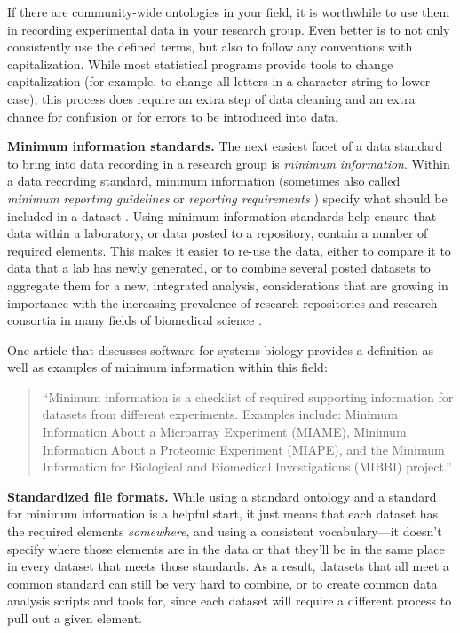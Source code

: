 \documentclass[]{tufte-book}
\begin{document}
If there are community-wide ontologies in your field, it is worthwhile to use
them in recording experimental data in your research group. Even better is to
not only consistently use the defined terms, but also to follow any conventions
with capitalization. While most statistical programs provide tools to change
capitalization (for example, to change all letters in a character string to
lower case), this process does require an extra step of data cleaning and an
extra chance for confusion or for errors to be introduced into data.

\textbf{Minimum information standards.} The next easiest facet of a data standard to
bring into data recording in a research group is \emph{minimum information}. Within a
data recording standard, minimum information (sometimes also called \emph{minimum
reporting guidelines} \citep{sansone2012toward} or \emph{reporting requirements}
\citep{brazma2006standards}) specify what should be included in a dataset
\citep{ghosh2011software}. Using minimum information standards help ensure that data
within a laboratory, or data posted to a repository, contain a number of
required elements. This makes it easier to re-use the data, either to compare it
to data that a lab has newly generated, or to combine several posted datasets to
aggregate them for a new, integrated analysis, considerations that are growing
in importance with the increasing prevalence of research repositories and
research consortia in many fields of biomedical science \citep{keller2017evolution}.

One article that discusses software for systems biology provides a definition
as well as examples of minimum information within this field:

\begin{quote}
``Minimum information is a checklist of required supporting information for
datasets from different experiments. Examples include: Minimum Information About
a Microarray Experiment (MIAME), Minimum Information About a Proteomic
Experiment (MIAPE), and the Minimum Information for Biological and Biomedical
Investigations (MIBBI) project.'' \citep{ghosh2011software}
\end{quote}

\textbf{Standardized file formats.} While using a standard ontology and a standard for
minimum information is a helpful start, it just means that each dataset has the
required elements \emph{somewhere}, and using a consistent vocabulary---it doesn't
specify where those elements are in the data or that they'll be in the same
place in every dataset that meets those standards. As a result, datasets that all
meet a common standard can still be very hard to combine, or to create common
data analysis scripts and tools for, since each dataset will require a different
process to pull out a given element.
\end{document}
